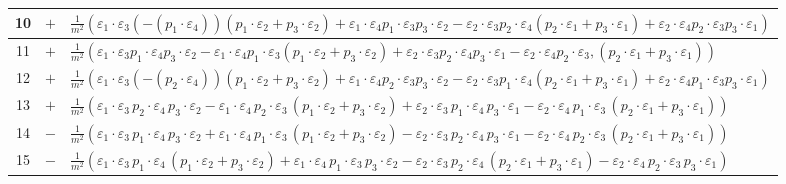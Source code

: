 \begin{table}[hbtp]
\begin{tabular}{|c|c|>{\centering\arraybackslash}m{11.5cm}|}
        10 & $+$ & $\frac{1}{m^2} ( 
            \varepsilon_1 \cdot \varepsilon_3  ( - (p_1 \cdot \varepsilon_4) )  (p_1 \cdot \varepsilon_2 + p_3 \cdot \varepsilon_2) 
            + \varepsilon_1 \cdot \varepsilon_4  p_1 \cdot \varepsilon_3  p_3 \cdot \varepsilon_2 
            - \varepsilon_2 \cdot \varepsilon_3  p_2 \cdot \varepsilon_4  (p_2 \cdot \varepsilon_1 + p_3 \cdot \varepsilon_1) 
            + \varepsilon_2 \cdot \varepsilon_4  p_2 \cdot \varepsilon_3  p_3 \cdot \varepsilon_1 
            )$ \\ \hline 
        11 & $+$ & $\frac{1}{m^2} (
            \varepsilon_1 \cdot \varepsilon_3  p_1 \cdot \varepsilon_4  p_3 \cdot \varepsilon_2
            - \varepsilon_1 \cdot \varepsilon_4  p_1 \cdot \varepsilon_3  (p_1 \cdot \varepsilon_2 + p_3 \cdot \varepsilon_2)
            + \varepsilon_2 \cdot \varepsilon_3 p_2 \cdot \varepsilon_4  p_3 \cdot \varepsilon_1
            - \varepsilon_2 \cdot \varepsilon_4  p_2 \cdot \varepsilon_3, (p_2 \cdot \varepsilon_1 + p_3 \cdot \varepsilon_1)
            )$ \\ \hline 
        12 & $+$ & $\frac{1}{m^2} (
            \varepsilon_1 \cdot \varepsilon_3  ( - (p_2 \cdot \varepsilon_4) )  (p_1 \cdot \varepsilon_2 + p_3 \cdot \varepsilon_2)
            + \varepsilon_1 \cdot \varepsilon_4  p_2 \cdot \varepsilon_3  p_3 \cdot \varepsilon_2
            - \varepsilon_2 \cdot \varepsilon_3 p_1 \cdot \varepsilon_4  (p_2 \cdot \varepsilon_1 + p_3 \cdot \varepsilon_1)
            + \varepsilon_2 \cdot \varepsilon_4  p_1 \cdot \varepsilon_3  p_3 \cdot \varepsilon_1
            )$  \\ \hline
        13 & $+$ & $\frac{1}{m^2}(\varepsilon_1\cdot\varepsilon_3\,p_2\cdot\varepsilon_4\,p_3\cdot\varepsilon_2-\varepsilon_1\cdot\varepsilon_4\,p_2\cdot\varepsilon_3\,(p_1\cdot\varepsilon_2+p_3\cdot\varepsilon_2)+\varepsilon_2\cdot\varepsilon_3\,p_1\cdot\varepsilon_4\,p_3\cdot\varepsilon_1-\varepsilon_2\cdot\varepsilon_4\,p_1\cdot\varepsilon_3\,(p_2\cdot\varepsilon_1+p_3\cdot\varepsilon_1))$ \\ \hline 
        14 & $-$ & $\frac{1}{m^2}(\varepsilon_1\cdot\varepsilon_3\,p_1\cdot\varepsilon_4\,p_3\cdot\varepsilon_2+\varepsilon_1\cdot\varepsilon_4\,p_1\cdot\varepsilon_3\,(p_1\cdot\varepsilon_2+p_3\cdot\varepsilon_2)-\varepsilon_2\cdot\varepsilon_3\,p_2\cdot\varepsilon_4\,p_3\cdot\varepsilon_1-\varepsilon_2\cdot\varepsilon_4\,p_2\cdot\varepsilon_3\,(p_2\cdot\varepsilon_1+p_3\cdot\varepsilon_1))$ \\ \hline 
        15 & $-$ & $\frac{1}{m^2}(\varepsilon_1\cdot\varepsilon_3\,p_1\cdot\varepsilon_4\,(p_1\cdot\varepsilon_2+p_3\cdot\varepsilon_2)+\varepsilon_1\cdot\varepsilon_4\,p_1\cdot\varepsilon_3\,p_3\cdot\varepsilon_2-\varepsilon_2\cdot\varepsilon_3\,p_2\cdot\varepsilon_4\,(p_2\cdot\varepsilon_1+p_3\cdot\varepsilon_1)-\varepsilon_2\cdot\varepsilon_4\,p_2\cdot\varepsilon_3\,p_3\cdot\varepsilon_1)$ \\ \hline 

\end{tabular}
\end{table}
